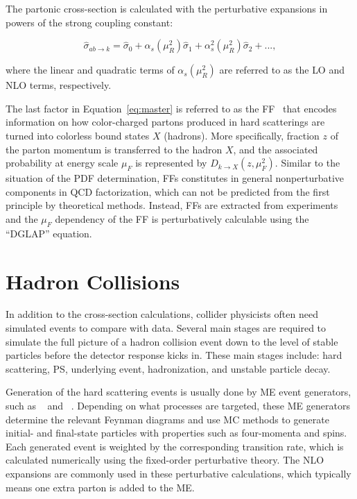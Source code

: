 The partonic cross-section is calculated with the perturbative expansions in powers of the strong coupling constant:

\begin{equation}
\label{eq:expand}
\hat{\sigma}_{ab\rightarrow k}=\hat{\sigma}_{0}+\alpha_{s}(\mu_{R}^2)\hat{\sigma}_{1}+\alpha_{s}^{2}(\mu_{R}^2)\hat{\sigma}_{2}+...,
\end{equation}

where the linear and quadratic terms of $\alpha_{s}(\mu_{R}^2)$ are referred to as the \ac{LO} and \ac{NLO} terms, respectively. 

The last factor in Equation~\ref{eq:master} is referred to as the \ac{FF}~\cite{Field:1976ve} that encodes information on how color-charged partons produced in hard scatterings are turned into colorless bound states $X$ (hadrons). More specifically, fraction $z$ of the parton momentum is transferred to the hadron $X$, and the associated probability at energy scale $\mu_{F}$ is represented by $D_{k\rightarrow X}(z,\mu_{F}^2)$. Similar to the situation of the \ac{PDF} determination, \acp{FF} constitutes in general nonperturbative components in \ac{QCD} factorization, which can not be predicted from the first principle by theoretical methods. Instead, \acp{FF} are extracted from experiments and the $\mu_F$ dependency of the \ac{FF} is perturbatively calculable using the ``DGLAP'' equation.

\section{Hadron Collisions}
\label{sec:Collision}

In addition to the cross-section calculations, collider physicists often need simulated events to compare with data. Several main stages are required to simulate the full picture of a hadron collision event down to the level of stable particles before the detector response kicks in. These main stages include: hard scattering, \ac{PS}, underlying event, hadronization, and unstable particle decay.

Generation of the hard scattering events is usually done by \ac{ME} event generators, such as \MG~\cite{Alwall:2014hca} and \Pow~\cite{Frixione:2007vw}. Depending on what processes are targeted, these \ac{ME} generators determine the relevant Feynman diagrams and use \ac{MC} methods to generate initial- and final-state particles with properties such as four-momenta and spins. Each generated event is weighted by the corresponding transition rate, which is calculated numerically using the fixed-order perturbative theory. The \ac{NLO} expansions are commonly used in these perturbative calculations, which typically means one extra parton is added to the \ac{ME}.

